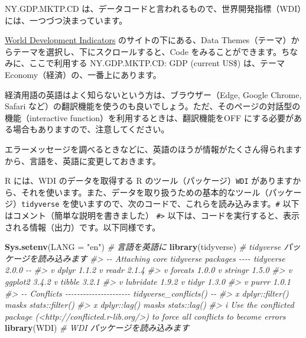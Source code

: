 \documentclass[
  xelatex, ja=standard]{bxjsbook}
\newenvironment{Shaded}{\begin{snugshade}}{\end{snugshade}}
\newcommand{\AttributeTok}[1]{\textcolor[rgb]{0.13,0.29,0.53}{#1}}
\newcommand{\CommentTok}[1]{\textcolor[rgb]{0.56,0.35,0.01}{\textit{#1}}}
\newcommand{\FunctionTok}[1]{\textcolor[rgb]{0.13,0.29,0.53}{\textbf{#1}}}
\newcommand{\NormalTok}[1]{#1}
\newcommand{\StringTok}[1]{\textcolor[rgb]{0.31,0.60,0.02}{#1}}
\theoremstyle{definition}
\theoremstyle{definition}
\theoremstyle{definition}
\theoremstyle{definition}
\theoremstyle{remark}
\begin{document}
NY.GDP.MKTP.CD は、データコードと言われるもので、世界開発指標（WDI）には、一つづつ決まっています。

\href{https://datatopics.worldbank.org/world-development-indicators/}{World Development Indicators} のサイトの下にある、Data Themes（テーマ）からテーマを選択し、下にスクロールすると、Code をみることができます。ちなみに、ここで利用する NY.GDP.MKTP.CD: GDP (current US\$) は、テーマ Economy（経済）の、一番上にあります。

経済用語の英語はよく知らないという方は、ブラウザー（Edge, Google Chrome, Safari など）の翻訳機能を使うのも良いでしょう。ただ、そのページの対話型の機能（interactive function）を利用するときは、翻訳機能をOFF にする必要がある場合もありますので、注意してください。

エラーメッセージを調べるときなどに、英語のほうが情報がたくさん得られますから、言語を、英語に変更しておきます。

R には、WDI のデータを取得する R のツール（パッケージ）\texttt{WDI} がありますから、それを使います。また、データを取り扱うための基本的なツール（パッケージ）\texttt{tidyverse} を使いますので、次のコードで、これらを読み込みます。\texttt{\#} 以下はコメント（簡単な説明を書きました） \texttt{\#\textgreater{}} 以下は、コードを実行すると、表示される情報（出力）です。以下同様です。

\begin{Shaded}
\begin{Highlighting}[]
\FunctionTok{Sys.setenv}\NormalTok{(}\AttributeTok{LANG =} \StringTok{"en"}\NormalTok{) }\CommentTok{\# 言語を英語に}
\FunctionTok{library}\NormalTok{(tidyverse)      }\CommentTok{\# tidyverse パッケージを読み込みます}
\CommentTok{\#\textgreater{} {-}{-} Attaching core tidyverse packages {-}{-}{-}{-} tidyverse 2.0.0 {-}{-}}
\CommentTok{\#\textgreater{} v dplyr     1.1.2     v readr     2.1.4}
\CommentTok{\#\textgreater{} v forcats   1.0.0     v stringr   1.5.0}
\CommentTok{\#\textgreater{} v ggplot2   3.4.2     v tibble    3.2.1}
\CommentTok{\#\textgreater{} v lubridate 1.9.2     v tidyr     1.3.0}
\CommentTok{\#\textgreater{} v purrr     1.0.1     }
\CommentTok{\#\textgreater{} {-}{-} Conflicts {-}{-}{-}{-}{-}{-}{-}{-}{-}{-}{-}{-}{-}{-}{-}{-}{-}{-}{-}{-}{-}{-} tidyverse\_conflicts() {-}{-}}
\CommentTok{\#\textgreater{} x dplyr::filter() masks stats::filter()}
\CommentTok{\#\textgreater{} x dplyr::lag()    masks stats::lag()}
\CommentTok{\#\textgreater{} i Use the conflicted package (\textless{}http://conflicted.r{-}lib.org/\textgreater{}) to force all conflicts to become errors}
\FunctionTok{library}\NormalTok{(WDI)            }\CommentTok{\# WDI パッケージを読み込みます}
\end{Highlighting}
\end{Shaded}
\end{document}

